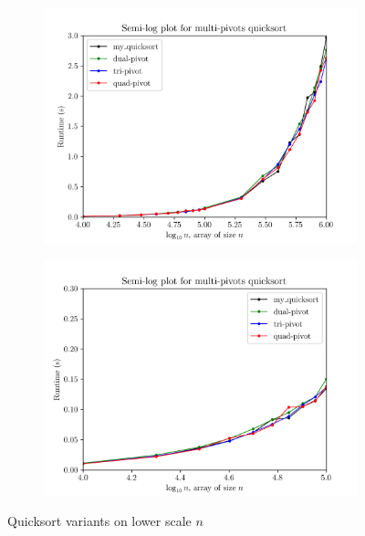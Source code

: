\documentclass[titlepage, 12pt]{article}
\begin{document}
\begin{figure}[h]
  \centering
  \begin{subfigure}{0.5\textwidth}
    \centering
    \includegraphics[width=\linewidth]{multp-zoomed-1} 
  \end{subfigure}%
  \begin{subfigure}{0.5\textwidth}
    \centering
    \includegraphics[width=\linewidth]{multp-zoomed-2} 
  \end{subfigure}
  \caption{Quicksort variants on lower scale \( n \)}
  \label{fig:multp-zoomed}
\end{figure}
\end{document}
